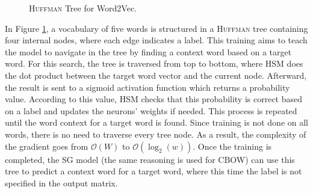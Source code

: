 \begin{figure}[!ht]
  \centering
  \caption{\textsc{Huffman} Tree for Word2Vec.}
  \label{fig:w2v:hsm:huffman}
\end{figure}

In Figure \ref{fig:w2v:hsm:huffman}, a vocabulary of five words is structured in a
\textsc{Huffman} tree containing four internal nodes, where each edge indicates a
label. This training aims to teach the model to navigate in the tree by finding
a context word based on a target word. For this search, the tree is traversed
from top to bottom, where HSM does the dot product between the target word
vector and the current node. Afterward, the result is sent to a sigmoid
activation function which returns a probability value. According to this value,
HSM checks that this probability is correct based on a label and updates the
neurons' weights if needed. This process is repeated until the word context for
a target word is found. Since training is not done on all words, there is no
need to traverse every tree node. As a result, the complexity of the gradient
goes from $\mathcal{O}(W)$ to $\mathcal{O}(\log_2(w))$. Once the training is
completed, the SG model (the same reasoning is used for CBOW) can use this tree
to predict a context word for a target word, where this time the label is not
specified in the output matrix.

